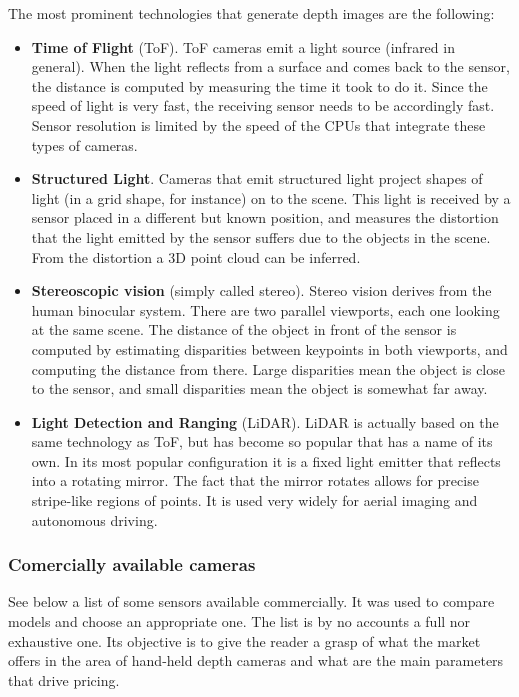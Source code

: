 \documentclass[../main.tex]{subfiles}
\begin{document}
The most prominent technologies that generate depth images are the following:
\begin{itemize}
    \item \textbf{Time of Flight} (ToF). ToF cameras emit a light source (infrared in general). When the light reflects from a surface and comes back to the sensor, the distance is computed by measuring the time it took to do it. Since the speed of light is very fast, the receiving sensor needs to be accordingly fast. Sensor resolution is limited by the speed of the CPUs that integrate these types of cameras.
    \item \textbf{Structured Light}. Cameras that emit structured light project shapes of light (in a grid shape, for instance) on to the scene. This light is received by a sensor placed in a different but known position, and measures the distortion that the light emitted by the sensor suffers due to the objects in the scene. From the distortion a 3D point cloud can be inferred.
    \item \textbf{Stereoscopic vision} (simply called stereo). Stereo vision derives from the human binocular system. There are two parallel viewports, each one looking at the same scene. The distance of the object in front of the sensor is computed by estimating disparities between keypoints in both viewports, and computing the distance from there. Large disparities mean the object is close to the sensor, and small disparities mean the object is somewhat far away.
    \item \textbf{Light Detection and Ranging} (LiDAR). LiDAR is actually based on the same technology as ToF, but has become so popular that has a name of its own. In its most popular configuration it is a fixed light emitter that reflects into a rotating mirror. The fact that the mirror rotates allows for precise stripe-like regions of points. It is used very widely for aerial imaging and autonomous driving.
\end{itemize}


\subsubsection{Comercially available cameras}
See below a list of some sensors available commercially. It was used to compare models and choose an appropriate one. The list is by no accounts a full nor exhaustive one. Its objective is to give the reader a grasp of what the market offers in the area of hand-held depth cameras and what are the main parameters that drive pricing. 
\end{document}

